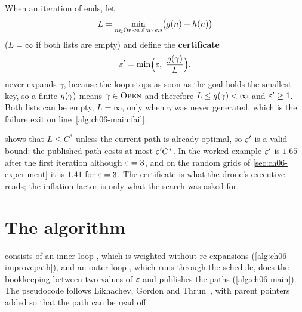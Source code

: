 \begin{definition}
\label{def:ch06-certificate}
When an iteration of \arastar ends, let
\begin{equation}
  L = \min_{n \in \textsc{Open} \cup \textsc{Incons}} \bigl(g(n) + h(n)\bigr)
  \label{eq:ch06-lower}
\end{equation}
($L = \infty$ if both lists are empty) and define the
\textbf{certificate}
\begin{equation}
  \eps' = \min\Bigl(\eps,\ \frac{\gcost(\gamma)}{L}\Bigr).
  \label{eq:ch06-certificate}
\end{equation}
\arastar never expands $\gamma$, because the loop stops as soon as the goal
holds the smallest key, so a finite $g(\gamma)$ means $\gamma \in \textsc{Open}$
and therefore $L \le g(\gamma) < \infty$ and $\varepsilon' \ge 1$. Both lists
can be empty, $L = \infty$, only when $\gamma$ was never generated, which is
the failure exit on line~\ref{alg:ch06-main:fail}.
\end{definition}

 shows that $L \le C^*$ unless the current path is
already optimal, so $\varepsilon'$ is a valid bound: the published path costs at most
$\varepsilon' C^*$. In the worked example $\varepsilon'$ is $1.65$ after the first iteration
although $\varepsilon = 3$, and on the random grids of \cref{sec:ch06-experiment} it
is $1.41$ for $\varepsilon = 3$. The certificate is what the drone's executive reads;
the inflation factor is only what the search was asked for.

\section{The algorithm}
\label{sec:ch06-algorithm}

\arastar consists of an inner loop \AraImprovePath, which is weighted \astar
without re-expansions (\cref{alg:ch06-improvepath}), and an outer loop
\AraMain, which runs through the schedule, does the bookkeeping between two
values of $\varepsilon$ and publishes the paths (\cref{alg:ch06-main}). The
pseudocode follows Likhachev, Gordon and Thrun~\cite{likhachev2003ara}, with
parent pointers added so that the path can be read off.

